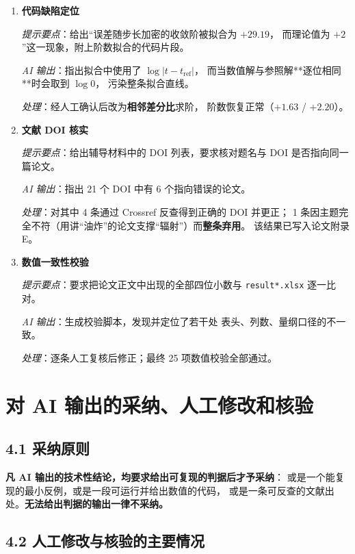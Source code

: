\documentclass[UTF8, a4paper, 11pt, fontset=windows]{ctexart}
\begin{document}
\begin{enumerate}[leftmargin=1.8em, itemsep=4pt]
  \item \textbf{代码缺陷定位}

    \textit{提示要点}：给出``误差随步长加密的收敛阶被拟合为 $+29.19$，
    而理论值为 $+2$''这一现象，附上阶数拟合的代码片段。

    \textit{AI 输出}：指出拟合中使用了 $\log|t-t_{\text{ref}}|$，
    而当数值解与参照解**逐位相同**时会取到 $\log 0$，
    污染整条拟合直线。

    \textit{处理}：经人工确认后改为\textbf{相邻差分比}求阶，
    阶数恢复正常（$+1.63$ / $+2.20$）。

  \item \textbf{文献 DOI 核实}

    \textit{提示要点}：给出辅导材料中的 DOI 列表，要求核对题名与 DOI 是否指向同一篇论文。

    \textit{AI 输出}：指出 21 个 DOI 中有 6 个指向错误的论文。

    \textit{处理}：对其中 4 条通过 Crossref 反查得到正确的 DOI 并更正；
    1 条因主题完全不符（用讲``油炸''的论文支撑``辐射''）而\textbf{整条弃用}。
    该结果已写入论文附录 E。

  \item \textbf{数值一致性校验}

    \textit{提示要点}：要求把论文正文中出现的全部四位小数与
    \texttt{result*.xlsx} 逐一比对。

    \textit{AI 输出}：生成校验脚本，发现并定位了若干处
    表头、列数、量纲口径的不一致。

    \textit{处理}：逐条人工复核后修正；最终 25 项数值校验全部通过。
\end{enumerate}

\section{对 AI 输出的采纳、人工修改和核验}

\subsection*{4.1 采纳原则}

\textbf{凡 AI 输出的技术性结论，均要求给出可复现的判据后才予采纳}：
或是一个能复现的最小反例，或是一段可运行并给出数值的代码，
或是一条可反查的文献出处。\textbf{无法给出判据的输出一律不采纳。}

\subsection*{4.2 人工修改与核验的主要情况}
\end{document}
